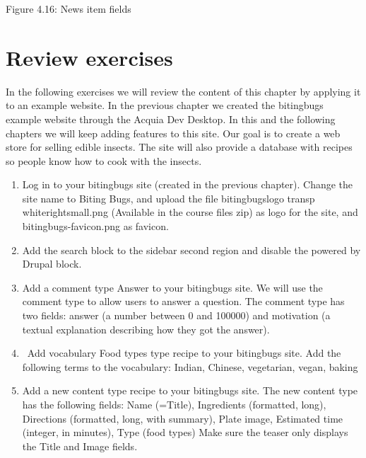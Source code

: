 Figure 4.16: News item fields
\section{Review exercises}
In the following exercises we will review the content of this chapter by applying it to an example website. In the previous chapter we created the bitingbugs example website through the Acquia Dev Desktop. In this and the following chapters we will keep adding features to this site. Our goal is to create a web store for selling edible insects. The site will also provide a database with recipes so people know how to cook with the insects.

\begin{enumerate}
    \item Log in to your bitingbugs site (created in the previous chapter). Change the site name to Biting Bugs, and upload the file bitingbugs\textunderscore \textunderscore logo \textunderscore transp \textunderscore white\textunderscore right\textunderscore small.png (Available in the course files zip) as logo for the site, and bitingbugs-favicon.png as favicon.
    \item Add the search block to the sidebar second region and disable the powered by Drupal block.
    \item Add a comment type Answer to your bitingbugs site. We will use the comment type to allow users to answer a question. The comment type has two fields: answer (a number between 0 and 100000) and motivation (a textual explanation describing how they got the answer).
    \item\ Add vocabulary Food types type recipe to your bitingbugs site. Add the following terms to the vocabulary: Indian, Chinese, vegetarian, vegan, baking
    \item Add a new content type recipe to your bitingbugs site. The new content type has the following fields: Name (=Title), Ingredients (formatted, long), Directions (formatted, long, with summary), Plate image, Estimated time (integer, in minutes), Type (food types)
    Make sure the teaser only displays the Title and Image fields.
\end{enumerate}
